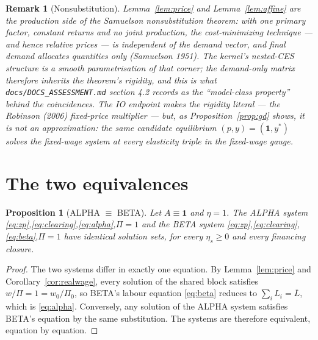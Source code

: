 \documentclass[11pt]{article}
\newtheorem{proposition}{Proposition}
\newtheorem{remark}{Remark}
\numberwithin{equation}{section}
\newcommand{\Lbar}{\bar{L}}
\newcommand{\one}{\mathbf{1}}
\begin{document}
\begin{remark}[Nonsubstitution]\label{rem:samuelson}
Lemma~\ref{lem:price} and Lemma~\ref{lem:affine} are the production side of
the Samuelson nonsubstitution theorem: with one primary factor, constant
returns and no joint production, the cost-minimizing technique --- and hence
relative prices --- is independent of the demand vector, and final demand
allocates quantities only (Samuelson 1951). The kernel's nested-CES
structure is a smooth parametrisation of that corner; the demand-only matrix
therefore inherits the theorem's rigidity, and this is what
\texttt{docs/DOCS\_ASSESSMENT.md} section 4.2 records as the ``model-class
property'' behind the coincidences. The IO endpoint makes the rigidity
literal --- the Robinson (2006) fixed-price multiplier --- but, as
Proposition~\ref{prop:gd} shows, it is not an approximation:
\textcolor{revisionV3}{the same candidate equilibrium $(p,y)=(\one,y^{\ast})$
solves the fixed-wage system at every elasticity triple in the fixed-wage
gauge.}
\end{remark}

\section{The two equivalences}\label{sec:equiv}

\begin{proposition}[ALPHA $\equiv$ BETA]\label{prop:ab}
Let $A \equiv \one$ and $\eta = 1$. The ALPHA system
\eqref{eq:zp},\eqref{eq:clearing},\eqref{eq:alpha},$\Pi = 1$ and the BETA
system \eqref{eq:zp},\eqref{eq:clearing},\eqref{eq:beta},$\Pi = 1$ have
identical solution sets, for every $\eta_s \geq 0$ and every financing
closure.
\end{proposition}

\begin{proof}
The two systems differ in exactly one equation. By
Lemma~\ref{lem:price} and Corollary~\ref{cor:realwage}, every solution of
the shared block satisfies $w/\Pi = 1 = w_0/\Pi_0$, so BETA's labour
equation \eqref{eq:beta} reduces to $\sum_i L_i = \Lbar$, which is
\eqref{eq:alpha}. Conversely, any solution of the ALPHA system satisfies
BETA's equation by the same substitution. The systems are therefore
equivalent, equation by equation.
\end{proof}
\end{document}
